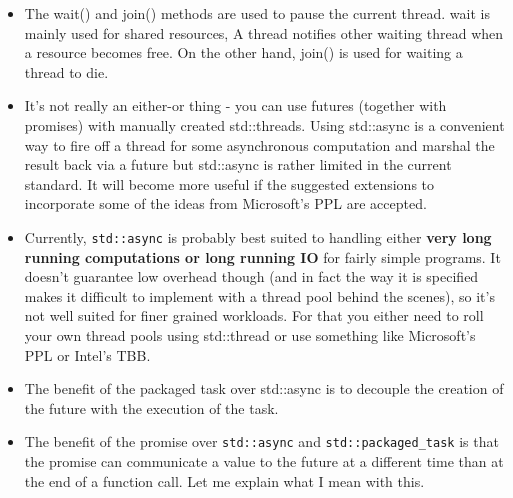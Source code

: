 \documentclass[a4paper,11pt,twoside]{book}
\begin{document}
\begin{itemize}
\begin{lstlisting}[frame=single, language=c++]
void task_bind(){
	std::packaged_task<int()> task(std::bind(f, 2, 11));
	std::future<int> result = task.get_future();
	task();
	std::cout << "task_bind:\t" << result.get() << '\n';
}

void task_thread(){
	std::packaged_task<int(int,int)> task(f);
	std::future<int> result = task.get_future();
	std::thread task_td(std::move(task), 2, 10);
	task_td.join();
	std::cout << "task_thread:\t" << result.get() << '\n';
}

int main(){
	task_lambda();
	task_bind();
	task_thread();
}
\end{lstlisting}

\item The wait() and join() methods are used to pause the current thread. wait is mainly used for shared resources, A thread notifies other waiting thread when a resource becomes free. On the other hand, join() is used for waiting a thread to die.

\item It's not really an either-or thing - you can use futures (together with promises) with manually created std::threads. Using std::async is a convenient way to fire off a thread for some asynchronous computation and marshal the result back via a future but std::async is rather limited in the current standard. It will become more useful if the suggested extensions to incorporate some of the ideas from Microsoft's PPL are accepted.

\item Currently, \texttt{std::async} is probably best suited to handling either \textbf{very long running computations or long running IO} for fairly simple programs. It doesn't guarantee low overhead though (and in fact the way it is specified makes it difficult to implement with a thread pool behind the scenes), so it's not well suited for finer grained workloads. For that you either need to roll your own thread pools using std::thread or use something like Microsoft's PPL or Intel's TBB. 

\item The benefit of the packaged task over std::async is to decouple the creation of the future with the execution of the task.

\item The benefit of the promise over \texttt{std::async} and \texttt{std::packaged\_task} is that the promise can communicate a value to the future at a different time than at the end of a function call. Let me explain what I mean with this.


\end{itemize}
\end{document}
